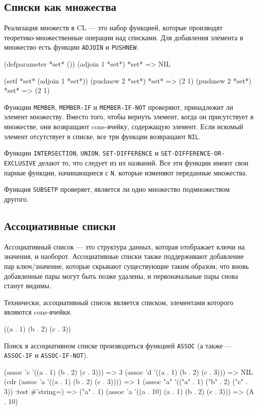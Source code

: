 \subsection{Списки как множества}
Реализация множеств в CL — это набор функцией, которые производят теоретико-множественные операции над списками. Для добавления элемента в множество есть функции \lstinline{ADJOIN} и \lstinline{PUSHNEW}.
\begin{cllst}{}{}
(defparameter *set* ())
(adjoin 1 *set*)
*set* => NIL

(setf *set* (adjoin 1 *set*))
(pushnew 2 *set*)
*set* => (2 1)
(pushnew 2 *set*)
*set* => (2 1)
\end{cllst}

Функции \lstinline{MEMBER}, \lstinline{MEMBER-IF} и \lstinline{MEMBER-IF-NOT} проверяют, принадлежит ли элемент множеству. Вместо того, чтобы вернуть элемент, когда он присутствует в множестве, они возвращают cons-ячейку, содержащую элемент. Если искомый элемент отсутствует в списке, все три функции возвращают \lstinline{NIL}.

Функции \lstinline{INTERSECTION}, \lstinline{UNION}, \lstinline{SET-DIFFERENCE} и \lstinline{SET-DIFFERENCE-OR-EXCLUSIVE} делают то, что следует из их названий. Все эти функции имеют свои парные функции, начинающиеся с \lstinline{N}, которые изменяют переданные множества.

Функция \lstinline{SUBSETP} проверяет, является ли одно множество подмножеством другого.

\subsection{Ассоциативные списки}
Ассоциативный список — это структура данных, которая отображает ключи на значения, и наоборот. Ассоциативные списки также поддерживают добавление пар ключ/значение, которые скрывают существующие таким образом, что вновь добавленные пары могут быть позже удалены, и первоначальные пары снова станут видимы.

Технически, ассоциативный список является списком, элементами которого являются cons-ячейки.
\begin{cllst}{}{}
((a . 1) (b . 2) (c . 3))
\end{cllst}

Поиск в ассоциативном списке производиться функцией \lstinline{ASSOC} (а также — \lstinline{ASSOC-IF} и \lstinline{ASSOC-IF-NOT}).
\begin{cllst}{}{}
(assoc 'c '((a . 1) (b . 2) (c . 3))) => 3
(assoc 'd '((a . 1) (b . 2) (c . 3))) => NIL
(cdr (assoc 'a '((a . 1) (b . 2) (c . 3)))) => 1
(assoc "a" '(("a" . 1) ("b" . 2) ("c" . 3)) :test #'string=) => ("a" . 1)
(assoc 'a '((a . 10) (a . 1) (b . 2) (c . 3))) => (A . 10)
\end{cllst}

